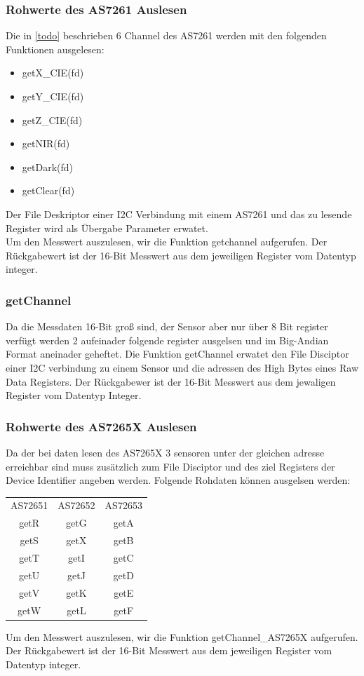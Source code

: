 \subsubsection{Rohwerte des AS7261 Auslesen}
Die in \ref{todo} beschrieben 6 Channel des AS7261 werden mit den folgenden Funktionen ausgelesen:
\begin{itemize}
	\item getX\_CIE(fd)
	\item getY\_CIE(fd)
	\item getZ\_CIE(fd)
	\item getNIR(fd)
	\item getDark(fd) 
	\item getClear(fd)
\end{itemize}
Der File Deskriptor einer I2C Verbindung mit einem AS7261 und das zu lesende Register wird als Übergabe Parameter erwatet.\\
Um den Messwert auszulesen, wir die Funktion getchannel aufgerufen.
Der Rückgabewert ist der 16-Bit Messwert aus dem jeweiligen Register vom Datentyp integer.

\subsubsection{getChannel}
Da die Messdaten 16-Bit groß sind, der Sensor aber nur über 8 Bit register verfügt werden 2 aufeinader folgende register ausgelsen und im Big-Andian Format aneinader geheftet.
Die Funktion getChannel erwatet den File Disciptor einer I2C verbindung zu einem Sensor und die adressen des High Bytes eines Raw Data Registers.
Der Rückgabewer ist der 16-Bit Messwert aus dem jewaligen Register vom Datentyp Integer.
\subsubsection{Rohwerte des AS7265X Auslesen}
Da der bei daten lesen des AS7265X 3 sensoren unter der gleichen adresse erreichbar sind muss zusätzlich zum File Disciptor und des ziel Registers der Device Identifier angeben werden.
Folgende Rohdaten können ausgelsen werden:
\begin{center}
\begin{tabular}{ c c c }
 	AS72651 & AS72652 & AS72653 \\ 
 	getR & getG & getA \\  
 	getS & getX & getB \\
 	getT & getI & getC \\  
 	getU & getJ & getD \\
 	getV & getK & getE \\  
 	getW & getL & getF \\
\end{tabular}
\end{center}
Um den Messwert auszulesen, wir die Funktion getChannel\_AS7265X aufgerufen.\\
Der Rückgabewert ist der 16-Bit Messwert aus dem jeweiligen Register vom Datentyp integer.

